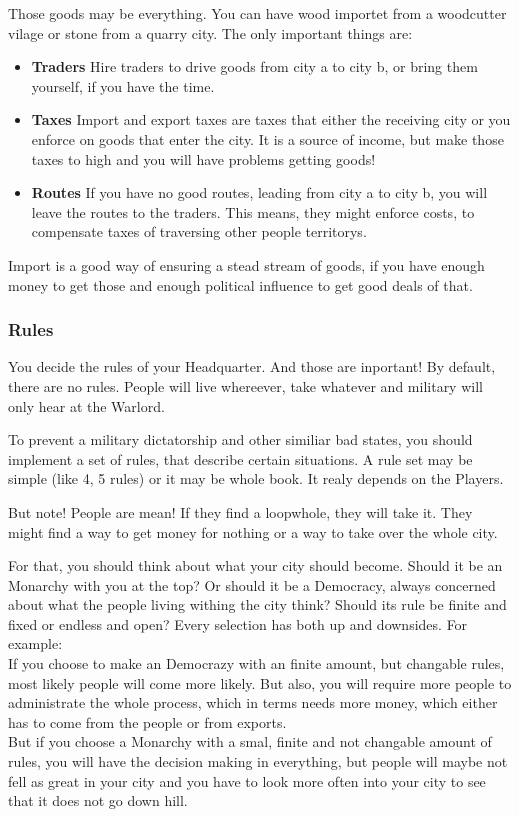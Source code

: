 \documentclass[10pt,twoside,twocolumn,openany]{book}
\begin{document}
Those goods may be everything. You can have wood importet from a woodcutter vilage or stone from a quarry city. The only important things are:

\begin{itemize}
\item \textbf{Traders} Hire traders to drive goods from city a to city b, or bring them yourself, if you have the time.
\item \textbf{Taxes} Import and export taxes are taxes that either the receiving city or you enforce on goods that enter the city. It is a source of income, but make those taxes to high and you will have problems getting goods!
\item \textbf{Routes} If you have no good routes, leading from city a to city b, you will leave the routes to the traders. This means, they might enforce costs, to compensate taxes of traversing other people territorys.
\end{itemize}

Import is a good way of ensuring a stead stream of goods, if you have enough money to get those and enough political influence to get good deals of that.

\subsubsection{Rules}

You decide the rules of your Headquarter. And those are inportant! By default, there are no rules. People will live whereever, take whatever and military will only hear at the Warlord.

To prevent a military dictatorship and other similiar bad states, you should implement a set of rules, that describe certain situations. A rule set may be simple (like 4, 5 rules) or it may be whole book. It realy depends on the Players.

But note! People are mean! If they find a loopwhole, they will take it. They might find a way to get money for nothing or a way to take over the whole city.

For that, you should think about what your city should become. Should it be an Monarchy with you at the top? Or should it be a Democracy, always concerned about what the people living withing the city think? Should its rule be finite and fixed or endless and open? Every selection has both up and downsides. For example:\\
If you choose to make an Democrazy with an finite amount, but changable rules, most likely people will come more likely. But also, you will require more people to administrate the whole process, which in terms needs more money, which either has to come from the people or from exports.\\
But if you choose a Monarchy with a smal, finite and not changable amount of rules, you will have the decision making in everything, but people will maybe not fell as great in your city and you have to look more often into your city to see that it does not go down hill.\\
\end{document}
